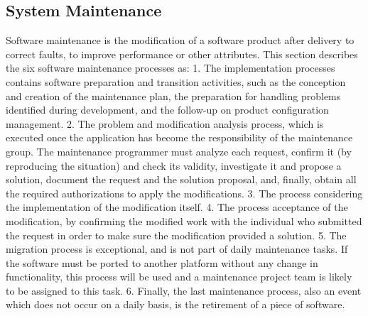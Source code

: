 \documentclass[a4paper,12pt]{article}
\begin{document}
\subsection{System Maintenance}  
\hspace{5mm}  
  Software maintenance is the modification of a software product after delivery to correct faults, to improve performance or other attributes. This section describes the six software maintenance processes as:
1. The implementation processes contains software preparation and transition activities, such as the conception and creation of the maintenance plan, the preparation for handling problems identified during development, and the follow-up on product configuration management. 
2. The problem and modification analysis process, which is executed once the application has become the responsibility of the maintenance group. The maintenance programmer must analyze each request, confirm it (by reproducing the situation) and check its validity, investigate it and propose a solution, document the request and the solution proposal, and, finally, obtain all the required authorizations to apply the modifications. 
3. The process considering the implementation of the modification itself. 
4. The process acceptance of the modification, by confirming the modified work with the individual who submitted the request in order to make sure the modification provided a solution. 
5. The migration process is exceptional, and is not part of daily maintenance tasks. If the software must be ported to another platform without any change in functionality, this process will be used and a maintenance project team is likely to be assigned to this task. 
6. Finally, the last maintenance process, also an event which does not occur on a daily basis, is the retirement of a piece of software. 
\newpage
\end{document}
